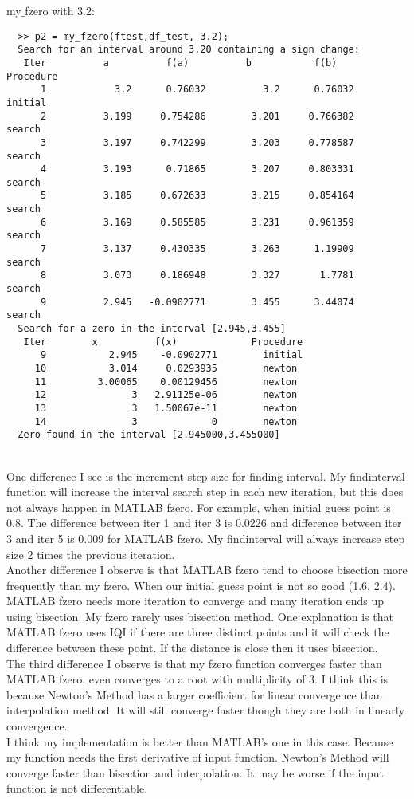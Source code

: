 \documentclass{article}
\begin{document}
my$\_$fzero with 3.2:
\begin{verbatim}
  >> p2 = my_fzero(ftest,df_test, 3.2);
  Search for an interval around 3.20 containing a sign change:
   Iter          a          f(a)          b           f(b)         Procedure
      1            3.2      0.76032          3.2      0.76032        initial
      2          3.199     0.754286        3.201     0.766382        search
      3          3.197     0.742299        3.203     0.778587        search
      4          3.193      0.71865        3.207     0.803331        search
      5          3.185     0.672633        3.215     0.854164        search
      6          3.169     0.585585        3.231     0.961359        search
      7          3.137     0.430335        3.263      1.19909        search
      8          3.073     0.186948        3.327       1.7781        search
      9          2.945   -0.0902771        3.455      3.44074        search
  Search for a zero in the interval [2.945,3.455]
   Iter        x          f(x)             Procedure
      9           2.945    -0.0902771        initial
     10           3.014     0.0293935        newton
     11         3.00065    0.00129456        newton
     12               3   2.91125e-06        newton
     13               3   1.50067e-11        newton
     14               3             0        newton
  Zero found in the interval [2.945000,3.455000]
\end{verbatim}
\\
One difference I see is the increment step size for finding interval.
My findinterval function will increase the interval search step in each new iteration, but this does not always happen in MATLAB fzero.
For example, when initial guess point is 0.8. The difference between iter 1 and iter 3 is 0.0226 and difference between iter 3 and iter 5 is 0.009 for MATLAB fzero.
My findinterval will always increase step size 2 times the previous iteration.
\\
Another difference I observe is that MATLAB fzero tend to choose bisection more frequently than my fzero. 
When our initial guess point is not so good (1.6, 2.4). MATLAB fzero needs more iteration to converge and many iteration ends up using bisection.
My fzero rarely uses bisection method. 
One explanation is that MATLAB fzero uses IQI if there are three distinct points and it will check the difference between these point.
If the distance is close then it uses bisection.
\\
The third difference I observe is that my fzero function converges faster than MATLAB fzero, even converges to a root with multiplicity of 3.
I think this is because Newton's Method has a larger coefficient for linear convergence than interpolation method.
It will still converge faster though they are both in linearly convergence.
\\
I think my implementation is better than MATLAB's one in this case. 
Because my function needs the first derivative of input function.
Newton's Method will converge faster than bisection and interpolation.
It may be worse if the input function is not differentiable.
\end{document}
